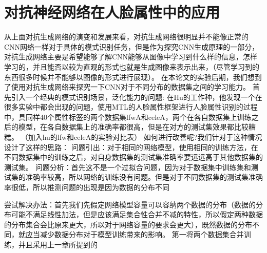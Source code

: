 \section{对抗神经网络在人脸属性中的应用}
从上面对抗生成网络的演变和发展来看，对抗生成网络很明显并不能像正常的CNN网络一样对于具体的模式识别任务，但是作为探究CNN生成原理的一部分，对抗生成网络主要是希望能够了解CNN能够从图像中学习到什么样的信息，怎样学习的，并且能否以较为直观的形式也就是生成图像来表示出来，（尽管学习到的东西很多时候并不能够以图像的形式进行展现）。
在本论文的实验后期，我们想到了使用对抗生成网络来探究一下CNN对于不同分布的数据集之间的学习能力。
首先引入一个经典的模式识别场景，泛化能力的问题:
在Hu的工作种，他发现一个在很多实验中都会出现的问题，使用MTL的人脸属性框架进行人脸属性识别的过程中，具同样40个属性标签的两个数据集lfwA和celeA，两个在各自数据集上训练之后的模型，在各自数据集上的准确率都很高，但是在对方的测试集效果都比较糟糕。
（加入hu的lfw和celeA的实验对比表）
如何进行改善呢?我们针对于这种情况设计了这样的思路：
问题引出：对于相同的网络模型，使用相同的训练方法，在不同数据集中的训练之后，对自身数据集的测试集准确率要远远高于其他数据集的测试集。
问题分析：首先这不是一个过拟合问题，因为对于数据集中训练集和测试集的准确率较高，所以网络的训练没有问题。但是对于不同数据集的测试集准确率很低，所以推测问题的出现是因为数据的分布不同

尝试解决办法：首先我们先假定网络模型容量可以容纳两个数据的分布（数据的分布可能不满足线性加法，但是应该满足集合性合并不减的特性，所以假定两种数据的分布集合会比原来更大，所以对于网络容量的要求会更大），既然数据的分布不同，就应当减少数据分布对于模型训练带来的影响。
	第一将两个数据集合并训练，并且采用上一章所提到的









